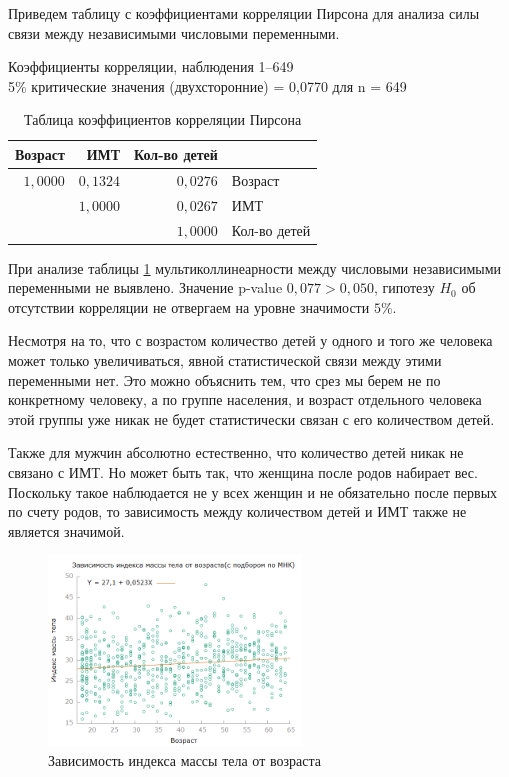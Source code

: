 \documentclass[a4paper,12pt]{article}
\begin{document}
Приведем таблицу с коэффициентами корреляции Пирсона для анализа силы связи между независимыми числовыми переменными. 

\begin{table}[H]
\begin{center}
	Коэффициенты корреляции, наблюдения 1--649\\
	5\% критические значения (двухсторонние) = 0,0770 для n = 649\\
	\vspace{8pt}
	\begin{tabular}{|r|r|r|l|}
		\hline
		Возраст & ИМТ & Кол-во детей &\\
		\hline
		$1,0000$ & $0,1324$ & $0,0276$ & Возраст\\
		\hline
		& $1,0000$ & $0,0267$ & ИМТ\\
		\hline
		&  & $1,0000$ & Кол-во детей\\
		\hline
	\end{tabular}
	\caption{Таблица коэффициентов корреляции Пирсона}
	\label{tab:pris}
\end{center}
\end{table}

При анализе таблицы \ref{tab:pris} мультиколлинеарности между числовыми независимыми переменными не выявлено. Значение p-value $0,077 > 0,050$, гипотезу $H_0$ об отсутствии корреляции не отвергаем на уровне значимости $5\%$.

Несмотря на то, что с возрастом количество детей у одного и того же человека может только увеличиваться, явной статистической связи между этими переменными нет. Это можно объяснить тем, что срез мы берем не по конкретному человеку, а по группе населения, и возраст отдельного человека этой группы уже никак не будет статистически связан с его количеством детей. 

Также для мужчин абсолютно естественно, что количество детей никак не связано с ИМТ. Но может быть так, что женщина после родов набирает вес. Поскольку такое наблюдается не у всех женщин и не обязательно после первых по счету родов, то зависимость между количеством детей и ИМТ также не является значимой.

\begin{figure}[H]
	\includegraphics[width=0.6\textwidth]{../[graphics]/bmi-age.png}
	\centering
	\caption{Зависимость индекса массы тела от возраста}
	\label{fig:bmi-age}
\end{figure}
\end{document}
